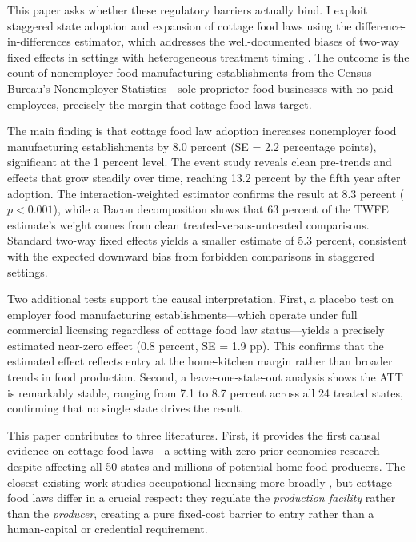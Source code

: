 \documentclass[12pt]{article}
\begin{document}
This paper asks whether these regulatory barriers actually bind. I exploit staggered state adoption and expansion of cottage food laws using the \citet{callaway2021difference} difference-in-differences estimator, which addresses the well-documented biases of two-way fixed effects in settings with heterogeneous treatment timing \citep{goodman2021difference, sun2021estimating, dechaisemartin2020two}. The outcome is the count of nonemployer food manufacturing establishments from the Census Bureau's Nonemployer Statistics---sole-proprietor food businesses with no paid employees, precisely the margin that cottage food laws target.

The main finding is that cottage food law adoption increases nonemployer food manufacturing establishments by 8.0 percent (SE = 2.2 percentage points), significant at the 1 percent level. The event study reveals clean pre-trends and effects that grow steadily over time, reaching 13.2 percent by the fifth year after adoption. The \citet{sun2021estimating} interaction-weighted estimator confirms the result at 8.3 percent ($p < 0.001$), while a Bacon decomposition \citep{goodman2021difference} shows that 63 percent of the TWFE estimate's weight comes from clean treated-versus-untreated comparisons. Standard two-way fixed effects yields a smaller estimate of 5.3 percent, consistent with the expected downward bias from forbidden comparisons in staggered settings.

Two additional tests support the causal interpretation. First, a placebo test on employer food manufacturing establishments---which operate under full commercial licensing regardless of cottage food law status---yields a precisely estimated near-zero effect (0.8 percent, SE = 1.9 pp). This confirms that the estimated effect reflects entry at the home-kitchen margin rather than broader trends in food production. Second, a leave-one-state-out analysis shows the ATT is remarkably stable, ranging from 7.1 to 8.7 percent across all 24 treated states, confirming that no single state drives the result.

This paper contributes to three literatures. First, it provides the first causal evidence on cottage food laws---a setting with zero prior economics research despite affecting all 50 states and millions of potential home food producers. The closest existing work studies occupational licensing more broadly \citep{kleiner2006licensing, kleiner2015reforming}, but cottage food laws differ in a crucial respect: they regulate the \textit{production facility} rather than the \textit{producer}, creating a pure fixed-cost barrier to entry rather than a human-capital or credential requirement.
\end{document}
